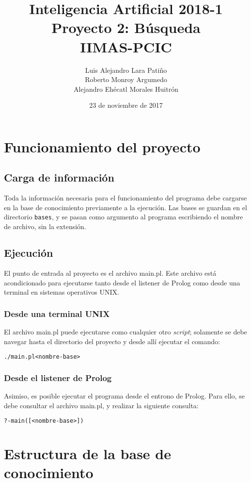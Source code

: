 \documentclass[11pt]{article}
\title{Inteligencia Artificial 2018-1 \\ Proyecto 2: Búsqueda\\
\vspace{2mm}
\small{IIMAS-PCIC}}
\author{Luis Alejandro Lara Patiño\\Roberto Monroy Argumedo\\
Alejandro Ehécatl Morales Huitrón}
\date{23 de noviembre de 2017}
\newcommand{\bt}{\begin{alltt}}
\newcommand{\et}{\end{alltt}}
\begin{document}
\maketitle

\tableofcontents

\section{Funcionamiento del proyecto}

\subsection{Carga de información}
Toda la información necesaria para el funcionamiento del programa debe cargarse en la base de conocimiento previamente a la ejecución. Las bases se guardan en el directorio \texttt{bases}, y se pasan como argumento al programa escribiendo el nombre de archivo, sin la extensión.

\subsection{Ejecución}

El punto de entrada al proyecto es el archivo main.pl. Este archivo está acondicionado para ejecutarse tanto desde el listener de Prolog como desde una terminal en sistemas operativos UNIX.

\subsubsection{Desde una terminal UNIX}
El archivo main.pl puede ejecutarse como cualquier otro \textit{script}; solamente se debe navegar hasta el directorio del proyecto y desde allí ejecutar el comando:

\bt
    ./main.pl <nombre-base>
\et

\subsubsection{Desde el listener de Prolog}
Asimiso, es posible ejecutar el programa desde el entrono de Prolog. Para ello, se debe consultar el archivo main.pl, y realizar la siguiente consulta:

\bt
    ?- main([<nombre-base>])
\et

\section{Estructura de la base de conocimiento}
\end{document}
